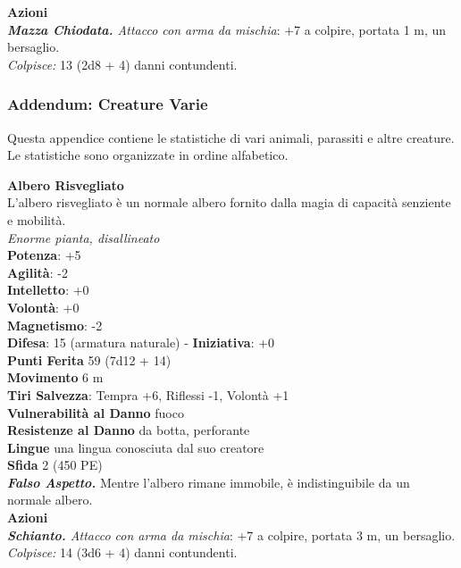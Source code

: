 \begin{multicols}{2}
\smallskip\textbf{Azioni}\\
\emph{\textbf{Mazza Chiodata.} Attacco con arma da mischia}: +7 a colpire, portata 1 m, un bersaglio.\\
\emph{Colpisce:} 13 (2d8 + 4) danni contundenti.\\

\pagebreak

\subsubsection{Addendum: Creature Varie}

Questa appendice contiene le statistiche di vari animali, parassiti e altre creature. Le statistiche sono organizzate in ordine alfabetico.

\medskip\textbf{Albero Risvegliato}\\
L'albero risvegliato è un normale albero fornito dalla magia di capacità senziente e mobilità.\\
\emph{Enorme pianta, disallineato}\\
\textbf{Potenza}: +5\\
\textbf{Agilità}: -2\\
\textbf{Intelletto}: +0\\
\textbf{Volontà}: +0\\
\textbf{Magnetismo}: -2\\
\textbf{Difesa}: 15 (armatura naturale) - \textbf{Iniziativa}: +0\\
\textbf{Punti Ferita} 59 (7d12 + 14)\\
\textbf{Movimento} 6 m\\
\textbf{Tiri Salvezza}: Tempra +6, Riflessi -1, Volontà +1\\
\textbf{Vulnerabilità al Danno} fuoco\\
\textbf{Resistenze al Danno} da botta, perforante\\
\textbf{Lingue} una lingua conosciuta dal suo creatore\\
\textbf{Sfida} 2 (450 PE)\smallskip\\
\emph{\textbf{Falso Aspetto.}} Mentre l'albero rimane immobile, è indistinguibile da un normale albero.\\
\smallskip\textbf{Azioni}\\
\emph{\textbf{Schianto.} Attacco con arma da mischia}: +7 a colpire, portata 3 m, un bersaglio.\\
\emph{Colpisce:} 14 (3d6 + 4) danni contundenti.\\


\end{multicols}
